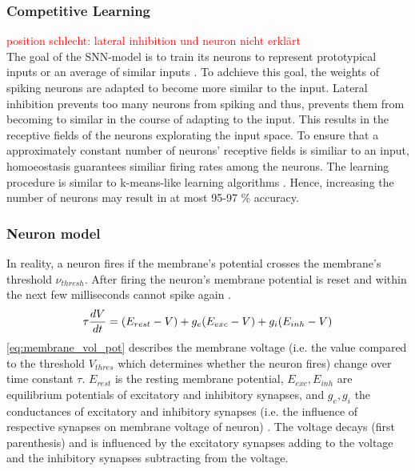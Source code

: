 \subsubsection{Competitive Learning}
\textcolor{red}{position schlecht: lateral inhibition und neuron nicht erklärt\\}
The goal of the \ac{SNN}-model is to train its neurons to represent prototypical inputs or an average of similar inputs \cite{SNN}.
To adchieve this goal, the weights of spiking neurons are adapted to become more similar to the input.
Lateral inhibition prevents too many neurons from spiking and thus, prevents them from becoming to similar in the course of adapting to the input.
This results in the receptive fields of the neurons explorating the input space.
To ensure that a approximately constant number of neurons' receptive fields is similiar to an input, 
homoeostasis guarantees similiar firing rates among the neurons.
The learning procedure is similar to k-means-like learning algorithms \cite{SNN}.
Hence, increasing the number of neurons may result in at most 95-97 \% accuracy.


\subsubsection{Neuron model}
\label{subsubsec:neuron_model}
In reality, a neuron fires if the membrane's potential crosses the membrane's threshold $\nu_{thresh}$.
After firing the neuron's membrane potential is reset and within the next few milliseconds cannot spike again \cite{SNN}.
%
\begin{equation}
    \centering
    \label{eq:membrane_vol_pot}
    \tau \frac{dV}{dt} = (E_{rest} - V) + g_e(E_{exc} - V) + g_i(E_{inh} - V)
\end{equation}
%
\autoref{eq:membrane_vol_pot} describes the membrane voltage 
(i.e. the value compared to the threshold $V_{thres}$ which determines whether the neuron fires) change over time constant $\tau$.
$E_{rest}$ is the resting membrane potential, $E_{exc}, E_{inh}$ are equilibrium potentials of excitatory and inhibitory synapses, 
and $g_e, g_i$ the conductances of excitatory and inhibitory synapses (i.e. the influence of respective synapses on membrane voltage of neuron) \cite{SNN}. 
The voltage decays (first parenthesis) and is influenced by the excitatory synapses 
adding to the voltage and the inhibitory synapses subtracting from the voltage.



